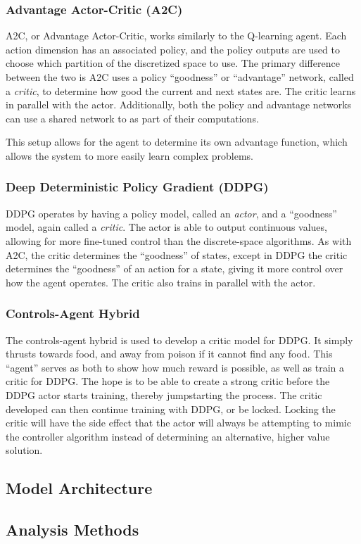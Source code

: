 \subsubsection{Advantage Actor-Critic (A2C)}
A2C, or Advantage Actor-Critic, works similarly to the Q-learning agent.
Each action dimension has an associated policy, and the policy outputs are used to
choose which partition of the discretized space to use.
The primary difference between the two is A2C uses a policy ``goodness'' or
``advantage'' network, called a \textit{critic}, to determine how good the current
and next states are.
The critic learns in parallel with the actor.
Additionally, both the policy and advantage networks can use a shared network to as
part of their computations.

This setup allows for the agent to determine its own advantage function, which
allows the system to more easily learn complex problems.

\subsubsection{Deep Deterministic Policy Gradient (DDPG)}
DDPG operates by having a policy model, called an \textit{actor}, and a ``goodness''
model, again called a \textit{critic}.
The actor is able to output continuous values, allowing for more fine-tuned control
than the discrete-space algorithms.
As with A2C, the critic determines the ``goodness'' of states, except in DDPG the
critic determines the ``goodness'' of an action for a state, giving it more control
over how the agent operates.
The critic also trains in parallel with the actor.

\subsubsection{Controls-Agent Hybrid}
The controls-agent hybrid is used to develop a critic model for DDPG\@.
It simply thrusts towards food, and away from poison if it cannot find any food.
This ``agent'' serves as both to show how much reward is possible, as well as train a
critic for DDPG\@.
The hope is to be able to create a strong critic before the DDPG actor starts
training, thereby jumpstarting the process.
The critic developed can then continue training with DDPG, or be locked.
Locking the critic will have the side effect that the actor will always be attempting
to mimic the controller algorithm instead of determining an alternative, higher value
solution.

\subsection{Model Architecture}\label{subsec:model-architecture}

\subsection{Analysis Methods}\label{subsec:analysis-methods}
